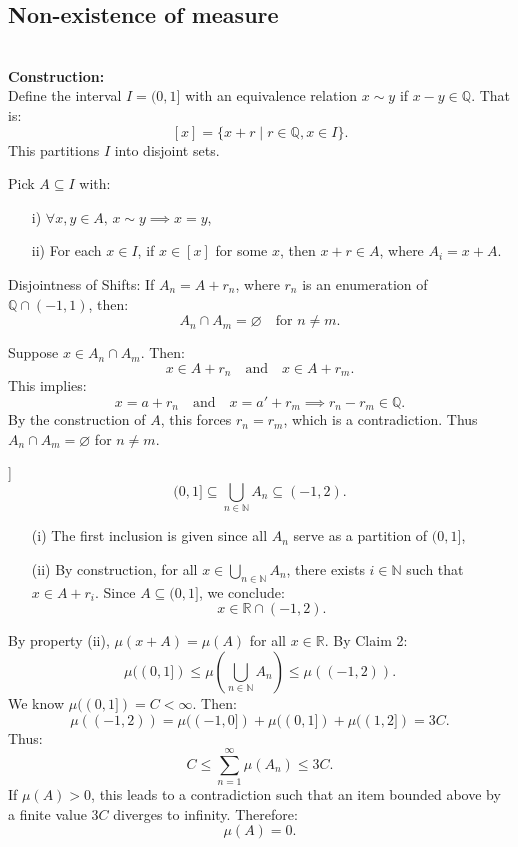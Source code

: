 \subsection{Non-existence of measure}
\label{proof: non-existence}
\begin{prf*}\\
\textbf{Construction:}\\
Define the interval \( I = (0, 1] \) with an equivalence relation \( x \sim y \) if \( x - y \in \mathbb{Q} \). That is:
\[
[x] = \{x + r \mid r \in \mathbb{Q}, x \in I\}.
\]
This partitions \( I \) into disjoint sets.

\noindent Pick \( A \subseteq I \) with:
\begin{enumerate}
    \item[i)] \(\forall x, y \in A, \, x \sim y \implies x = y\),
    \item[ii)] For each \( x \in I \), if \( x \in [x] \) for some \( x \), then \( x + r \in A \), where \( A_i = x + A \).
\end{enumerate}

\begin{clm}Disjointness of Shifts: If \( A_n = A + r_n \), where \( r_n \) is an enumeration of \( \mathbb{Q} \cap (-1, 1) \), then:
\[
A_n \cap A_m = \varnothing \quad \text{for } n \neq m.
\]
\end{clm}

\noindent Suppose \( x \in A_n \cap A_m \). Then:
\[
x \in A + r_n \quad \text{and} \quad x \in A + r_m.
\]
This implies:
\[
x = a + r_n \quad \text{and} \quad x = a' + r_m \implies r_n - r_m \in \mathbb{Q}.
\]
By the construction of \( A \), this forces \( r_n = r_m \), which is a contradiction. Thus \( A_n \cap A_m = \varnothing \) for \( n \neq m \).

\begin{clm}[Covering of \((0, 1]\)]
\[
(0, 1] \subseteq \bigcup_{n \in \mathbb{N}} A_n \subseteq (-1, 2).
\]
\end{clm}

\begin{enumerate}
    \item[(i)] The first inclusion is given since all \( A_n \) serve as a partition of \((0, 1]\),
    \item[(ii)] By construction, for all \( x \in \bigcup_{n \in \mathbb{N}} A_n \), there exists \( i \in \mathbb{N} \) such that \( x \in A + r_i \). Since \( A \subseteq (0, 1] \), we conclude:
    \[
    x \in \mathbb{R} \cap (-1, 2).
    \]
\end{enumerate}

By property (ii), \( \mu(x + A) = \mu(A) \) for all \( x \in \mathbb{R} \). By Claim 2:
\[
\mu((0, 1]) \leq \mu\left(\bigcup_{n \in \mathbb{N}} A_n\right) \leq \mu((-1, 2)).
\]
We know \(\mu((0, 1]) = C < \infty\). Then:
\[
\mu((-1, 2)) = \mu((-1, 0]) + \mu((0, 1]) + \mu((1, 2]) = 3C.
\]
Thus:
\[
C \leq \sum_{n=1}^\infty \mu(A_n) \leq 3C.
\]
If \( \mu(A) > 0 \), this leads to a contradiction such that an item bounded above by a finite value $3C$ diverges to infinity. Therefore:
\[
\mu(A) = 0.
\]

\end{prf*}


